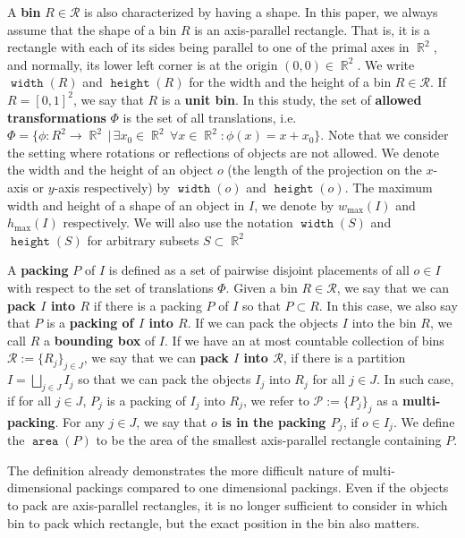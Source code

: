 \documentclass[a4paper,UKenglish,cleveref, autoref, thm-restate]{lipics_v2021}
\DeclareMathOperator{\area}{\mathtt{area}}
\DeclareMathOperator{\width}{\mathtt{width}}
\DeclareMathOperator{\height}{\mathtt{height}}
\DeclareMathOperator{\R}{\mathbb{R}}
\begin{document}
A \textbf{bin} $R \in \mathcal{R}$ is also characterized by having a shape. In this paper, we always assume that the shape of a bin $R$ is an axis-parallel rectangle. That is, it is a rectangle with each of its sides being parallel to one of the primal axes in $\R^2$, and normally, its lower left corner is at the origin $(0,0) \in \R^2$. 
We write $\width(R)$ and $\height(R)$ for the width and the height of a bin $R \in \mathcal{R}$. If $R=[0,1]^2$, we say that $R$ is a \textbf{unit bin}.
In this study, the set of \textbf{allowed transformations} $\Phi$ is the set of all translations, i.e. $\Phi = \{\phi: R^2 \to \R^2 \, | \, \exists x_0 \in \R^2 \, \forall x \in \R^2: \phi(x) = x + x_0 \}$. Note that we consider the setting where rotations or reflections of objects are not allowed.
%
We denote the width and the height of an object $o$ (the length of the projection on the $x$-axis or $y$-axis respectively) by $\width(o)$ and $\height(o)$. The maximum width and height of a shape of an object in $I$, we denote by $w_{\max}(I)$ and $h_{\max}(I)$ respectively. We will also use the notation $\width(S)$ and $\height(S)$ for arbitrary subsets $S \subset \R^2$


A \textbf{packing} $P$ of $I$ is defined as a set of pairwise disjoint placements of all $o \in I$ with respect to the set of translations $\Phi$. 
%
Given a bin $R \in \mathcal{R}$, we say that we can \textbf{pack $I$ into $R$} if there is a packing $P$ of $I$ so that $P \subset R$. In this case, we also say that $P$ is a \textbf{packing of $I$ into $R$}. If we can pack the objects $I$ into the bin $R$, we call $R$ a \textbf{bounding box} of $I$. 
%
If we have an at most countable collection of bins $\mathcal{R}:= \{R_j\}_{j \in J}$, we say that we can \textbf{pack $I$ into $\mathcal{R}$}, if there is a partition $I=\bigsqcup_{j \in J} I_j$ so that we can pack the objects $I_j$ into $R_j$ for all $j \in J$. In such case, if for all $j \in J$, $P_j$ is a packing of $I_j$ into $R_j$, we refer to $\mathcal{P}:=\{P_j\}_j$ as a \textbf{multi-packing}. For any $j \in J$, we say that \textbf{$o$ is in the packing $P_j$}, if $o \in I_j$.
%
We define the $\area(P)$ to be the area of the smallest axis-parallel rectangle containing $P$.

The definition already demonstrates the more difficult nature of multi-dimensional packings compared to one dimensional packings. Even if the objects to pack are axis-parallel rectangles, it is no longer sufficient to consider in which bin to pack which rectangle, but the exact position in the bin also matters.
\end{document}
